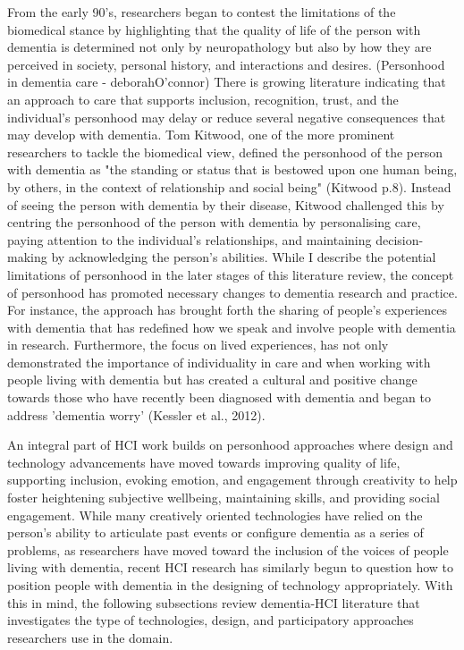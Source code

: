 From the early 90's, researchers began to contest the limitations of the biomedical stance by highlighting that the quality of life of the person with dementia is determined not only by neuropathology but also by how they are perceived in society, personal history, and interactions and desires. (Personhood in dementia care - deborahO'connor) There is growing literature indicating that an approach to care that supports inclusion, recognition, trust, and the individual's personhood may delay or reduce several negative consequences that may develop with dementia. Tom Kitwood, one of the more prominent researchers to tackle the biomedical view, defined the personhood of the person with dementia as "the standing or status that is bestowed upon one human being, by others, in the context of relationship and social being" (Kitwood p.8). Instead of seeing the person with dementia by their disease, Kitwood challenged this by centring the personhood of the person with dementia by personalising care, paying attention to the individual's relationships, and maintaining decision-making by acknowledging the person's abilities.    While I describe the potential limitations of personhood in the later stages of this literature review, the concept of personhood has promoted necessary changes to dementia research and practice. For instance, the approach has brought forth the sharing of people's experiences with dementia that has redefined how we speak and involve people with dementia in research. Furthermore, the focus on lived experiences, has not only demonstrated the importance of individuality in care and when working with people living with dementia but has created a cultural and positive change towards those who have recently been diagnosed with dementia and began to address 'dementia worry' (Kessler et al., 2012).

An integral part of HCI work builds on personhood approaches where design and technology advancements have moved towards improving quality of life, supporting inclusion, evoking emotion, and engagement through creativity to help foster heightening subjective wellbeing, maintaining skills, and providing social engagement. While many creatively oriented technologies have relied on the person's ability to articulate past events or configure dementia as a series of problems, as researchers have moved toward the inclusion of the voices of people living with dementia, recent HCI research has similarly begun to question how to position people with dementia in the designing of technology appropriately. With this in mind, the following subsections review dementia-HCI literature that investigates the type of technologies, design, and participatory approaches researchers use in the domain.

